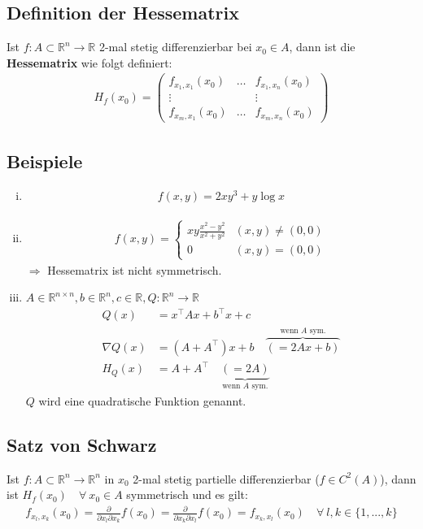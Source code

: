 \documentclass[11pt,a4paper]{book}
\newcommand {\R}	{\mathbb{R}}
\newcommand {\Rn}	{\mathbb{R}^n}
\newcommand {\Rnxn}	{\mathbb{R}^{n \times n}}
\newcommand{\1}    	{\mathbbm{1}}
\begin{document}
\subsection{Definition der Hessematrix}
Ist \(f : A \subset \Rn \rightarrow \R\) 2-mal stetig differenzierbar bei \(x_0 \in A\), dann ist die \textbf{Hessematrix} wie folgt definiert:
\begin{align*}
	H_f(x_0) = \left( \begin{array}{ccc}
		f_{x_1,x_1} (x_0) & \hdots & f_{x_1,x_n} (x_0) \\
		\vdots & & \vdots \\
		f_{x_m,x_1} (x_0) & \hdots & f_{x_m,x_n} (x_0)
	\end{array} \right)
\end{align*}

\subsection{Beispiele}
\begin{enumerate}[(i)]
	\item \begin{align*}
		f(x,y) = 2xy^3 + y \log x
	\end{align*}
	\item \begin{align*}
		f(x,y) = \left\{ \begin{array}{ll}
			xy \frac{x^2 - y^2}{x^2 + y^2} & (x,y) \neq (0,0) \\
			0 & (x,y) = (0,0)
		\end{array} \right.
	\end{align*}
	\(\Rightarrow\) Hessematrix ist nicht symmetrisch.
	\item \(A \in \Rnxn, b \in \Rn, c \in \R, Q : \Rn \rightarrow \R\)
	\begin{align*}
		Q(x) &= x^\top A x + b^\top x + c \\
		\nabla Q(x) &= \left( A + A^\top \right)x + b \quad \overbrace{( =  2Ax + b)}^{\textrm{wenn }A\textrm{ sym.}} \\
		H_Q(x) &= A + A^\top \quad \underbrace{( = 2A)}_{\textrm{wenn }A\textrm{ sym.}}
	\end{align*}
	\(Q\) wird eine quadratische Funktion genannt.
\end{enumerate}

\subsection{Satz von Schwarz}
Ist \(f : A \subset \Rn \rightarrow \Rn\) in \(x_0\) 2-mal stetig partielle differenzierbar (\(f \in C^2(A)\)), dann ist \(H_f(x_0) \quad \forall~ x_0 \in A\) symmetrisch und es gilt:
\begin{align*}
	f_{x_l, x_k} (x_0) = \frac{\partial}{\partial x_l \partial x_k} f(x_0) = \frac{\partial}{\partial x_k \partial x_l} f(x_0) = f_{x_k, x_l} (x_0) \quad \forall~ l,k \in \{ 1, ..., k \}
\end{align*}
\end{document}
